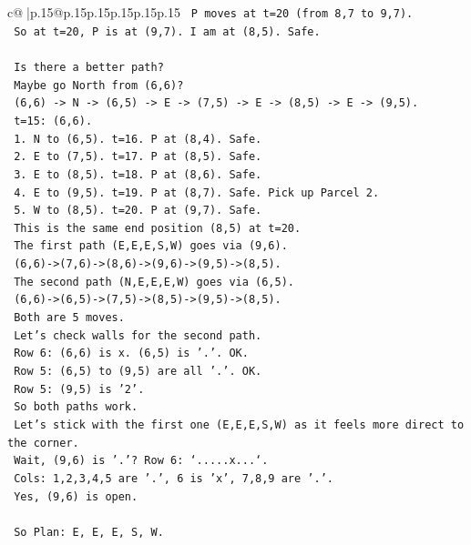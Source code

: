 \documentclass{article}
\begin{document}
{\begin{supertabular}{c@{$\;$}|p{.15\linewidth}@{}p{.15\linewidth}p{.15\linewidth}p{.15\linewidth}p{.15\linewidth}p{.15\linewidth}}
{{{\texttt{   P moves at t=20 (from 8,7 to 9,7).} \\
\texttt{   So at t=20, P is at (9,7). I am at (8,5). Safe.} \\
\\ 
\texttt{   Is there a better path?} \\
\texttt{   Maybe go North from (6,6)?} \\
\texttt{   (6,6) {-}> N {-}> (6,5) {-}> E {-}> (7,5) {-}> E {-}> (8,5) {-}> E {-}> (9,5).} \\
\texttt{   t=15: (6,6).} \\
\texttt{   1. N to (6,5). t=16. P at (8,4). Safe.} \\
\texttt{   2. E to (7,5). t=17. P at (8,5). Safe.} \\
\texttt{   3. E to (8,5). t=18. P at (8,6). Safe.} \\
\texttt{   4. E to (9,5). t=19. P at (8,7). Safe. Pick up Parcel 2.} \\
\texttt{   5. W to (8,5). t=20. P at (9,7). Safe.} \\
\texttt{   This is the same end position (8,5) at t=20.} \\
\texttt{   The first path (E,E,E,S,W) goes via (9,6).} \\
\texttt{   (6,6){-}>(7,6){-}>(8,6){-}>(9,6){-}>(9,5){-}>(8,5).} \\
\texttt{   The second path (N,E,E,E,W) goes via (6,5).} \\
\texttt{   (6,6){-}>(6,5){-}>(7,5){-}>(8,5){-}>(9,5){-}>(8,5).} \\
\texttt{   Both are 5 moves.} \\
\texttt{   Let's check walls for the second path.} \\
\texttt{   Row 6: (6,6) is x. (6,5) is '.'. OK.} \\
\texttt{   Row 5: (6,5) to (9,5) are all '.'. OK.} \\
\texttt{   Row 5: (9,5) is '2'.} \\
\texttt{   So both paths work.} \\
\texttt{   Let's stick with the first one (E,E,E,S,W) as it feels more direct to the corner.} \\
\texttt{   Wait, (9,6) is '.'? Row 6: `.....x...`.} \\
\texttt{   Cols: 1,2,3,4,5 are '.', 6 is 'x', 7,8,9 are '.'.} \\
\texttt{   Yes, (9,6) is open.} \\
\\ 
\texttt{   So Plan: E, E, E, S, W.} \\
}}}
\end{supertabular}}
\end{document}
